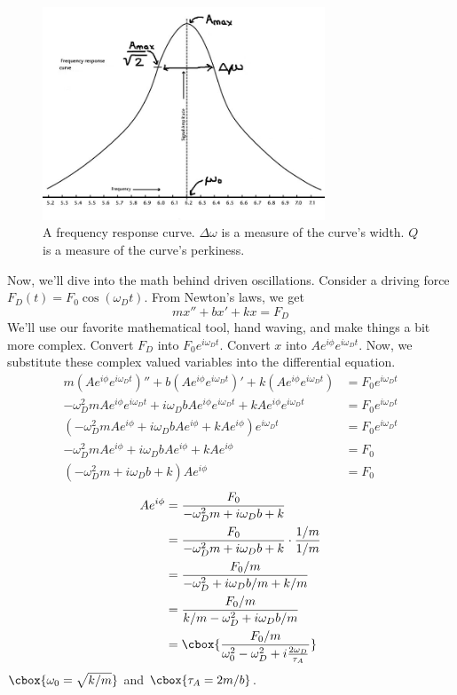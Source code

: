 \documentclass{hw}
\begin{document}
\begin{figure}[h]
  \centering
  \includegraphics[width=0.75\textwidth]{img/frequency-response.jpg}
  \caption{%
    A frequency response curve. $\Delta \omega$ is a measure of the curve's
    width. $Q$ is a measure of the curve's perkiness.
  }
  \label{fig:frequency-response}
\end{figure}

Now, we'll dive into the math behind driven oscillations. Consider a driving
force $F_D(t) = F_0 \cos(\omega_D t)$. From Newton's laws, we get
\[
  mx'' + bx' + kx = F_D
\]
We'll use our favorite mathematical tool, hand waving, and make things a bit
more complex. Convert $F_D$ into $F_0 e^{i \omega_D t}$. Convert $x$ into
$Ae^{i\phi}e^{i \omega_D t}$. Now, we substitute these complex valued variables
into the differential equation.
\begin{align*}
  m(Ae^{i\phi}e^{i \omega_D t})'' + 
    b(Ae^{i\phi}e^{i \omega_D t})' + 
    k(Ae^{i\phi}e^{i \omega_D t}) &= F_0 e^{i \omega_D t} \\
  -\omega_D^2 m Ae^{i\phi}e^{i \omega_D t} + 
    i \omega_D b Ae^{i\phi}e^{i \omega_D t} + 
    k A e^{i\phi}e^{i \omega_D t} &= F_0 e^{i \omega_D t} \\
  (-\omega_D^2 m Ae^{i\phi} + 
    i \omega_D b Ae^{i\phi} + 
    k A e^{i\phi})e^{i \omega_D t} &= F_0 e^{i \omega_D t} \\
  -\omega_D^2 m Ae^{i\phi} + 
    i \omega_D b Ae^{i\phi} + 
    k A e^{i\phi} &= F_0 \\
    (-\omega_D^2 m  + i \omega_D b  + k) A e^{i \phi} &= F_0
\end{align*}
\begin{align*}
    A e^{i \phi} &= \frac{F_0}{-\omega_D^2 m  + i \omega_D b  + k} \\
                 &= \frac{F_0}{-\omega_D^2 m  + i \omega_D b  + k} 
                      \cdot \frac{1/m}{1/m} \\
                 &= \frac{F_0/m}{-\omega_D^2  + i \omega_D b/m  + k/m} \\
                 &= \frac{F_0/m}{k/m - \omega_D^2  + i \omega_D b/m} \\
                 &= \cbox{%
                      \frac{F_0/m}
                      {\omega_0^2 - \omega_D^2  + i \frac{2\omega_D}{\tau_A}}
                    } 
\end{align*}
$\cbox{\omega_0 = \sqrt{k/m}}$ and $\cbox{\tau_A = 2m/b}$.
\end{document}
